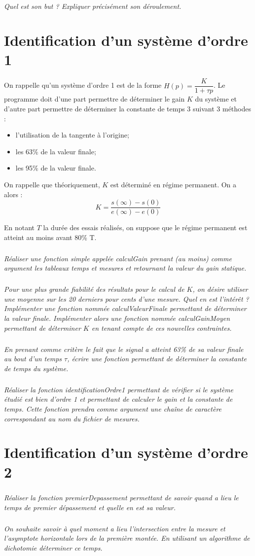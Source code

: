 \documentclass[10pt]{article}
\begin{document}
\subparagraph{}
\textit{Quel est son but ? Expliquer précisément son déroulement.}

\section{Identification d'un système d'ordre 1}
On rappelle qu'un système d'ordre 1 est de la forme $H(p)=\dfrac{K}{1 + \tau p}$. Le programme doit d'une part permettre de déterminer le gain $K$ du système et d'autre part permettre de déterminer la constante de temps 3 suivant 3 méthodes : 
\begin{itemize}
\item l'utilisation de la tangente à l'origine;
\item les 63\% de la valeur finale;
\item les 95\% de la valeur finale. 
\end{itemize}

On rappelle que théoriquement, $K$ est déterminé en régime permanent. On a alors : 
$$
K = \dfrac{s(\infty)-s(0)}{e(\infty)-e(0)}
$$

En notant $T$ la durée des essais réalisés, on suppose que le régime permanent est atteint au moins avant 80\% T. 


\subparagraph{}
\textit{Réaliser une fonction simple appelée \textsl{calculGain} prenant (au moins) comme argument les tableaux \textsl{temps} et \textsl{mesures} et retournant la valeur du gain statique.}

\subparagraph{}
\textit{Pour une plus grande fiabilité des résultats pour le calcul de $K$, on désire utiliser une moyenne sur les 20 derniers pour cents d'une mesure. Quel en est l'intérêt ? Implémenter une fonction nommée \textsl{calculValeurFinale} permettant de déterminer la valeur finale. Implémenter alors une fonction nommée  \textsl{calculGainMoyen} permettant de déterminer $K$ en tenant compte de ces nouvelles contraintes.}

\subparagraph{}
\textit{En prenant comme critère le fait que le signal a atteint 63\% de sa valeur finale au bout d'un temps $\tau$, écrire une fonction permettant de déterminer la constante de temps du système.}


\subparagraph{}
\textit{Réaliser la fonction \textsf{identificationOrdre1} permettant de vérifier si le système étudié est bien d'ordre 1 et permettant de calculer le gain et la constante de temps. Cette fonction prendra comme argument une chaîne de caractère correspondant au nom du fichier de mesures. }



\section{Identification d'un système d'ordre 2}
\subparagraph{}
\textit{Réaliser la fonction \textsf{premierDepassement} permettant de savoir quand a lieu le temps de premier dépassement et quelle en est sa valeur.}

\subparagraph{}
\textit{On souhaite savoir à quel moment a lieu l'intersection entre la mesure et l'asymptote horizontale lors de la première montée. En utilisant un algorithme de dichotomie déterminer ce temps.}
\end{document}

